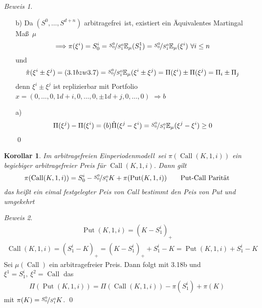 \documentclass[]{scrartcl}
\numberwithin{equation}{section}
\theoremstyle{plain}
\newtheorem{kor}[satz]{Korollar}
\theoremstyle{definition}
\theoremstyle{remark}
\theoremstyle{proof}
\newtheorem*{bew}{Beweis}
\newcommand{\E}{\mathbb{E}}
\newcommand{\call}{\operatorname{Call}}
\renewcommand{\put}{\operatorname{Put}}
\newcommand{\epm}{Einperiodenmodell}
\newcommand{\af}{arbitragefrei}
\newcommand{\amm}{Äquivalentes Martingal Maß}
\begin{document}
 	\begin{bew}\leavevmode
 		\begin{itemize}
 			\item[b)] Da $(S^0,…,S^{d+n})$ \af \ ist, existiert ein \amm\ $\mu$ 
 			\begin{align*}
	 			\Longrightarrow\pi(\xi^i)=S^i_0=\nicefrac{S^0_0}{S^0_1}\E_{\mu}(S_1^1)=\nicefrac{S^0_0}{S^0_1}\E_{\mu}(\xi^i)\ \forall i\le n 
	 		\end{align*} 
	 		und \begin{align*}
		 		\hat{\pi}(\xi^i\pm\xi^j)=(3.1bzw3.7)=\nicefrac{S_0^0}{S_1^0}\E_{\mu}(\xi^i\pm\xi^j)=\Pi(\xi^i)\pm\Pi(\xi^j)=\Pi_i\pm\Pi_j 
		 	\end{align*} 
		 	denn $\xi^i\pm\xi^j$ ist replizierbar mit Portfolio $x=(0,…,0,1d+i,0,…,0,\pm1d+j,0,…,0)$ $\Longrightarrow b$
 			\item[a)] 
	 		\begin{align*}
		 		\Pi(\xi^j)-\Pi(\xi^i)=(b) \hat{\Pi}(\xi^j-\xi^i)=\nicefrac{S_0^0}{S_1^0}\E_{\mu}(\xi^j-\xi^i)\ge 0 
		 	\end{align*}
		 	\qed
 		\end{itemize}
 	\end{bew}
 	\begin{kor}
 		Im \af en  \epm \ sei $\pi(\call(K,1,i))$ ein begiebiger \af er  Preis für $\call(K,1,i)$. Dann gilt
 		\begin{align*}
		 	\pi(\call (K,1,i))=S_0^i-\nicefrac{S_0^0}{S_1^0}K+\pi(\put (K,1,i))\qquad\text{Put-Call Parität} 
		 \end{align*} 
		 das heißt ein eimal festgelegter Peis von Call bestimmt den Peis von Put und umgekehrt
 	\end{kor}
 	\begin{bew}
 		\begin{align*}
	 		\put(K,1,i)=(K-S_1^i)_+
		 \end{align*}
		 \begin{align*}
			 \call(K,1,i)=(S^i_1-K)_+=(K-S_1^i)_++S_1^i-K=\put(K,1,i)+S_1^i-K 
		\end{align*} 
 		Sei $\mu(\call)$ ein  \af er Preis. Dann folgt mit 3.18b und $\xi^1=S^i_1,\ \xi^2=\call$ das \begin{align*}
	 		\Pi(\put(K,1,i))=\Pi(\call(K,1,i))-\pi(S^i_1)+\pi(K)
	 	\end{align*} 
	 	mit $\pi(K)=\nicefrac{S_0^0}{S_1^0}K$. \qed
 	\end{bew}
\end{document}
